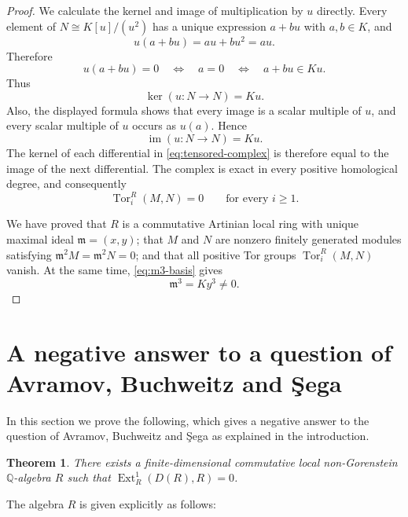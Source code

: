 \documentclass[a4paper]{amsart}
\newtheorem{theorem}{Theorem}[section]
\theoremstyle{definition}
\theoremstyle{remark}
\numberwithin{equation}{section}
\newcommand{\Ext}{\operatorname{Ext}}
\newcommand{\Tor}{\operatorname{Tor}}
\begin{document}
\begin{proof}
We calculate the kernel and image of multiplication by $u$ directly.
Every element of $N\cong K[u]/(u^2)$ has a unique expression
$a+bu$ with $a,b\in K$, and
\[
 u(a+bu)=au+bu^2=au.
\]
Therefore
\[
 u(a+bu)=0
 \quad\Longleftrightarrow\quad
 a=0
 \quad\Longleftrightarrow\quad
 a+bu\in Ku.
\]
Thus
\[
 \ker(u:N\to N)=Ku.
\]
Also, the displayed formula shows that every image is a scalar multiple
of $u$, and every scalar multiple of $u$ occurs as $u(a)$.  Hence
\[
 \operatorname{im}(u:N\to N)=Ku.
\]
The kernel of each differential in \eqref{eq:tensored-complex} is
therefore equal to the image of the next differential.  The complex is
exact in every positive homological degree, and consequently
\begin{equation}\label{eq:Tor-vanishing}
 \Tor_i^R(M,N)=0
 \qquad\text{for every }i\geq1.
\end{equation}

We have proved that $R$ is a commutative Artinian local ring with unique
maximal ideal $\mathfrak m=(x,y)$; that $M$ and $N$ are nonzero finitely
generated modules satisfying $\mathfrak m^2M=\mathfrak m^2N=0$; and
that all positive Tor groups $\Tor_i^R(M,N)$ vanish.  At the same time,
\eqref{eq:m3-basis} gives
\[
 \mathfrak m^3=Ky^3\neq0.
\]
\end{proof}


\section{A negative answer to a question of Avramov, Buchweitz and \c{S}ega}
In this section we prove the following, which gives a negative answer to the question of Avramov, Buchweitz and \c{S}ega as explained in the introduction.

\begin{theorem}
There exists a finite-dimensional commutative local non-Gorenstein $\mathbb{Q}$-algebra $R$ such that $\Ext_R^1(D(R),R)=0$.
\end{theorem}
The algebra $R$ is given explicitly as follows:
\end{document}
